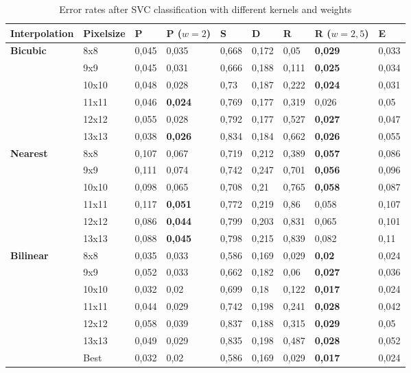 \documentclass{article}
\begin{document}
\begin{table}[H]
  \small
  \centering
    \begin{tabular}{l|l|lllllll|}
    \hline
    Interpolation & Pixelsize & P     & P ($w=2$) & S     & D     & R     & R ($w=2,5$) & E \\ 
    \hline
    \textbf{Bicubic} & 8x8   & 0,045 & 0,035 & 0,668 & 0,172 & 0,05  & \textbf{0,029} & 0,033 \\
    \textbf{} & 9x9   & 0,045 & 0,031 & 0,666 & 0,188 & 0,111 & \textbf{0,025} & 0,034 \\
    \textbf{} & 10x10 & 0,048 & 0,028 & 0,73  & 0,187 & 0,222 & \textbf{0,024} & 0,031 \\
    \textbf{} & 11x11 & 0,046 & \textbf{0,024} & 0,769 & 0,177 & 0,319 & 0,026 & 0,05 \\
    \textbf{} & 12x12 & 0,055 & 0,028 & 0,792 & 0,177 & 0,527 & \textbf{0,027} & 0,047 \\
    \textbf{} & 13x13 & 0,038 & \textbf{0,026} & 0,834 & 0,184 & 0,662 & \textbf{0,026} & 0,055 \\ \hline
    \textbf{Nearest} & 8x8   & 0,107 & 0,067 & 0,719 & 0,212 & 0,389 & \textbf{0,057} & 0,086 \\
    \textbf{} & 9x9   & 0,111 & 0,074 & 0,742 & 0,247 & 0,701 & \textbf{0,056} & 0,096 \\
    \textbf{} & 10x10 & 0,098 & 0,065 & 0,708 & 0,21  & 0,765 & \textbf{0,058} & 0,087 \\
    \textbf{} & 11x11 & 0,117 & \textbf{0,051} & 0,772 & 0,219 & 0,86  & 0,058 & 0,107 \\
    \textbf{} & 12x12 & 0,086 & \textbf{0,044} & 0,799 & 0,203 & 0,831 & 0,065 & 0,101 \\
    \textbf{} & 13x13 & 0,088 & \textbf{0,045} & 0,798 & 0,215 & 0,839 & 0,082 & 0,11 \\ \hline
    \textbf{Bilinear} & 8x8   & 0,035 & 0,033 & 0,586 & 0,169 & 0,029 & \textbf{0,02} & 0,024 \\
    \textbf{} & 9x9   & 0,052 & 0,033 & 0,662 & 0,182 & 0,06  & \textbf{0,027} & 0,036 \\
    \textbf{} & 10x10 & 0,032 & 0,02  & 0,699 & 0,18  & 0,122 & \textbf{0,017} & 0,024 \\
    \textbf{} & 11x11 & 0,044 & 0,029 & 0,742 & 0,198 & 0,241 & \textbf{0,028} & 0,042 \\
    \textbf{} & 12x12 & 0,058 & 0,039 & 0,837 & 0,188 & 0,315 & \textbf{0,029} & 0,05 \\
    \textbf{} & 13x13 & 0,049 & 0,029 & 0,835 & 0,198 & 0,487 & \textbf{0,028} & 0,052 \\ \hline
    \textbf{} & Best  & 0,032 & 0,02  & 0,586 & 0,169 & 0,029 & \textbf{0,017} & 0,024 \\
    \hline
    \end{tabular}
  \caption{Error rates after SVC classification with different kernels and weights} \label{table: error rate SVC}
\end{table}%
\end{document}
